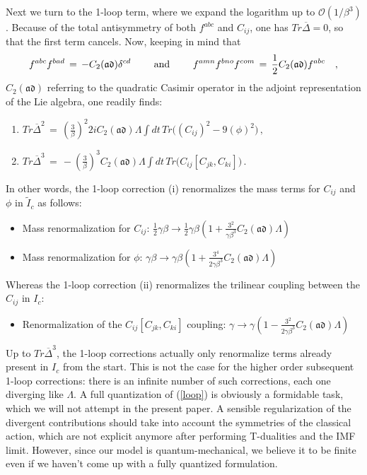 \documentclass[a4paper,11pt]{article}
\begin{document}
Next we turn to the 1-loop term, where we expand the logarithm up to $\mathcal{O}(1/\beta ^{3})$.
Because of the total antisymmetry of both $f^{abc}$ and $C_{ij}$, one has $Tr\overline{\Delta }=0$, so that
the first term cancels. 
Now, keeping in mind that 
\[
f^{abc}f^{bad}\,=\,-C_{2}(\mathfrak{ad})\delta ^{cd}\text{ \qquad and \qquad }
f^{amn}f^{bno}f^{com}\,=\,\frac{1}{2}C_{2}(\mathfrak{ad})f^{abc}\quad ,
\]
$C_2 (\mathfrak{ad})$ referring to the quadratic Casimir operator in the adjoint representation of the Lie algebra,
one readily finds:
\renewcommand{\theenumi}{(\roman{enumi})}
\begin{enumerate}
\item  $Tr\overline{\Delta }^{2}\,=\,\left( \frac{3}{\beta }\right)
^{2}2iC_{2}(\mathfrak{ad})\Lambda \int dt \,Tr\Big( (C_{ij})^{2}-9(\phi )^{2}\Big) \,,$ 
\item  $Tr\overline{\Delta }^{3}\,=\,-\left( \frac{3}{\beta }\right)
^{3}C_{2}(\mathfrak{ad})\Lambda \int dt \,Tr\Big( C_{ij}[C_{jk},C_{ki}]\Big) \,. $
\end{enumerate}
In other words, the 1-loop correction (i) renormalizes the mass terms
for $C_{ij}$ and $\phi $ in $\widetilde{I}_{c}$ as follows:
\begin{itemize}
\item  Mass renormalization for $C_{ij}$: $\frac{1}{2}\gamma \beta
\longrightarrow \frac{1}{2}\gamma \beta \left( 1+\frac{3^{2}}{\gamma\beta ^{3}}
C_{2}(\mathfrak{ad})\Lambda \right) $
\item  Mass renormalization for $\phi $: $\gamma\beta \longrightarrow \gamma\beta \left(
1+\frac{3^{4}}{2\gamma\beta^{3}}C_{2}(\mathfrak{ad})\Lambda \right) $
\end{itemize}
Whereas the 1-loop correction (ii) renormalizes the trilinear coupling
between the $C_{ij}$ in $I_{c}$:
\begin{itemize}
\item  Renormalization of the $C_{ij}[C_{jk},C_{ki}]$ coupling: $
\gamma\longrightarrow \gamma\left( 1-\frac{3^2}{2\gamma\beta^3}C_{2}(\mathfrak{ad})\Lambda \right)$
\end{itemize}

Up to $Tr\overline{\Delta }^{3}$, the 1-loop corrections actually only renormalize terms already present in 
$I_{c}$ from the start. This is not the case for the higher order subsequent 1-loop corrections: 
there is an infinite number of such corrections, each one diverging like $\Lambda$. 
A full quantization of (\ref{loop}) is obviously a formidable task, which we will not attempt
in the present paper. A sensible regularization of the divergent contributions should take into account
the symmetries of the classical action, which are not explicit anymore after performing T-dualities and
the IMF limit. However, since our model is quantum-mechanical, we believe it to be finite even if we haven't
come up with a fully quantized formulation. 
\end{document}
